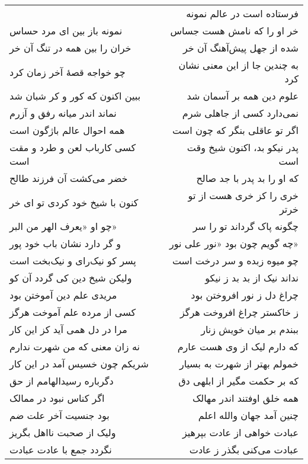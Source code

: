 \begin{center}
\begin{longtable}{l p{0.5cm} r}
&&
فرستاده است در عالم نمونه
\\
نمونه باز بین ای مرد حساس
&&
خر او را که نامش هست جساس
\\
خران را بین همه در تنگ آن خر
&&
شده از جهل پیش‌آهنگ آن خر
\\
چو خواجه قصهٔ آخر زمان کرد
&&
به چندین جا از این معنی نشان کرد
\\
ببین اکنون که کور و کر شبان شد
&&
علوم دین همه بر آسمان شد
\\
نماند اندر میانه رفق و آزرم
&&
نمی‌دارد کسی از جاهلی شرم
\\
همه احوال عالم باژگون است
&&
اگر تو عاقلی بنگر که چون است
\\
کسی کارباب لعن و طرد و مقت است
&&
پدر نیکو بد، اکنون شیخ وقت است
\\
خضر می‌کشت آن فرزند طالح
&&
که او را بد پدر با جد صالح
\\
کنون با شیخ خود کردی تو ای خر
&&
خری را کز خری هست از تو خرتر
\\
چو او «یعرف الهر من البر»
&&
چگونه پاک گرداند تو را سر
\\
و گر دارد نشان باب خود پور
&&
چه گویم چون بود «نور علی نور»
\\
پسر کو نیک‌رای و نیک‌بخت است
&&
چو میوه زبده و سر درخت است
\\
ولیکن شیخ دین کی گردد آن کو
&&
نداند نیک از بد بد ز نیکو
\\
مریدی علم دین آموختن بود
&&
چراغ دل ز نور افروختن بود
\\
کسی از مرده علم آموخت هرگز
&&
ز خاکستر چراغ افروخت هرگز
\\
مرا در دل همی آید کز این کار
&&
ببندم بر میان خویش زنار
\\
نه زان معنی که من شهرت ندارم
&&
که دارم لیک از وی هست عارم
\\
شریکم چون خسیس آمد در این کار
&&
خمولم بهتر از شهرت به بسیار
\\
دگرباره رسیدالهامم از حق
&&
که بر حکمت مگیر از ابلهی دق
\\
اگر کناس نبود در ممالک
&&
همه خلق اوفتند اندر مهالک
\\
بود جنسیت آخر علت ضم
&&
چنین آمد جهان والله اعلم
\\
ولیک از صحبت نااهل بگریز
&&
عبادت خواهی از عادت بپرهیز
\\
نگردد جمع با عادت عبادت
&&
عبادت می‌کنی بگذر ز عادت
\\
\end{longtable}
\end{center}
